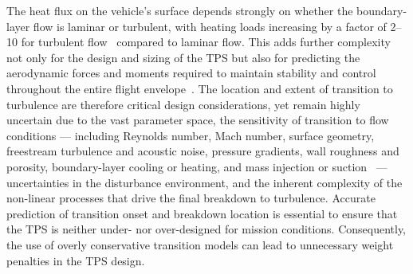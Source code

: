 The heat flux on the vehicle’s surface depends strongly on whether the boundary-layer flow is laminar or turbulent, with heating loads increasing by a factor of 2–10 for turbulent flow~\citep{White2005,VanDriest1952} compared to laminar flow. This adds further complexity not only for the design and sizing of the \gls{TPS} but also for predicting the aerodynamic forces and moments required to maintain stability and control throughout the entire flight envelope~\citep{Dalle2011}. The location and extent of transition to turbulence are therefore critical design considerations, yet remain highly uncertain due to the vast parameter space, the sensitivity of transition to flow conditions — including Reynolds number, Mach number, surface geometry, freestream turbulence and acoustic noise, pressure gradients, wall roughness and porosity, boundary-layer cooling or heating, and mass injection or suction~\citep{Cebeci2001} — uncertainties in the disturbance environment, and the inherent complexity of the non-linear processes that drive the final breakdown to turbulence. Accurate prediction of transition onset and breakdown location is essential to ensure that the \gls{TPS} is neither under- nor over-designed for mission conditions. Consequently, the use of overly conservative transition models can lead to unnecessary weight penalties in the \gls{TPS} design.







